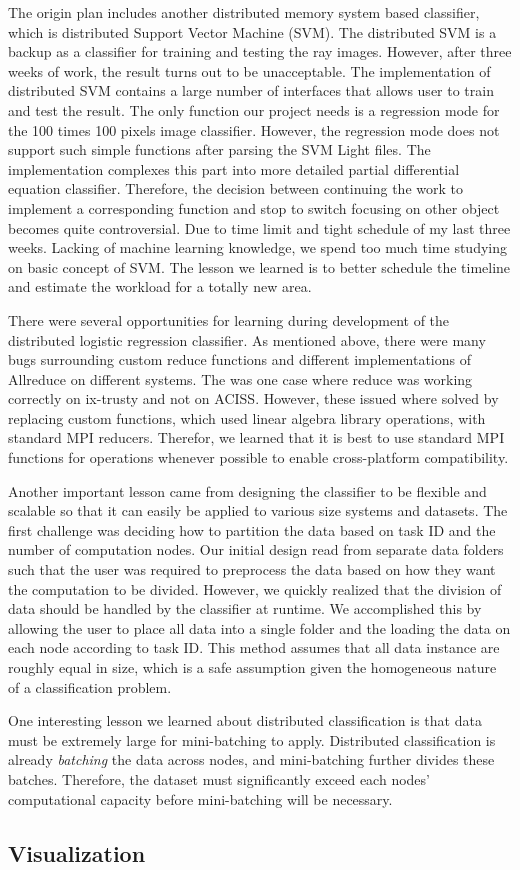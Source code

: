 The origin plan includes another distributed memory system based classifier, which is distributed Support Vector Machine (SVM). The distributed SVM is a backup as a classifier for training and testing the ray images. However, after three weeks of work, the result turns out to be unacceptable. The implementation of distributed SVM contains a large number of interfaces that allows user to train and test the result. The only function our project needs is a regression mode for the 100 times 100 pixels image classifier. However, the regression mode does not support such simple functions after parsing the SVM Light files. The implementation complexes this part into more detailed partial differential equation classifier. Therefore, the decision between continuing the work to implement a corresponding function and stop to switch focusing on other object becomes quite controversial. Due to time limit and tight schedule of my last three weeks. Lacking of machine learning knowledge, we spend too much time studying on basic concept of SVM. The lesson we learned is to better schedule the timeline and estimate the workload for a totally new area.

There were several opportunities for learning during development of the distributed logistic regression classifier.  As mentioned above, there were many bugs surrounding custom reduce functions and different implementations of Allreduce on different systems.  The was one case where reduce was working correctly on ix-trusty and not on ACISS.  However, these issued where solved by replacing custom functions, which used linear algebra library operations, with standard MPI reducers.  Therefor, we learned that it is best to use standard MPI functions for operations whenever possible to enable cross-platform compatibility.

Another important lesson came from designing the classifier to be flexible and scalable so that it can easily be applied to various size systems and datasets.  The first challenge was deciding how to partition the data based on task ID and the number of computation nodes.  Our initial design read from separate data folders such that the user was required to preprocess the data based on how they want the computation to be divided.  However, we quickly realized that the division of data should be handled by the classifier at runtime.  We accomplished this by allowing the user to place all data into a single folder and the loading the data on each node according to task ID.  This method assumes that all data instance are roughly equal in size, which is a safe assumption given the homogeneous nature of a classification problem.

One interesting lesson we learned about distributed classification is that data must be extremely large for mini-batching to apply.  Distributed classification is already \emph{batching} the data across nodes, and mini-batching further divides these batches.  Therefore, the dataset must significantly exceed each nodes' computational capacity before mini-batching will be necessary.


\subsection{Visualization}
